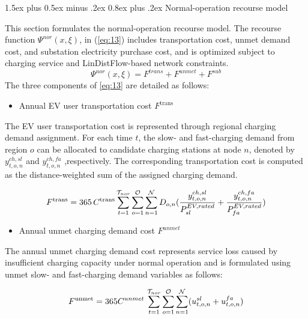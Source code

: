 \documentclass[journal]{IEEEtran}
\makeatletter
\renewcommand\subsubsection{\@startsection{subsubsection}{3}{\z@}%
  {1.5ex plus 0.5ex minus .2ex}%
  {0.8ex plus .2ex}%
  {\normalfont\normalsize\bfseries}}
\providecommand{\1}{\mathbf{1}}
\makeatother
\begin{document}
\subsubsection{Normal-operation recourse model}

This section formulates the normal-operation recourse model. The recourse function $\Psi^{{nor}}(x,\xi)$, in (\ref{eq:13})  includes transportation cost, unmet demand cost, and substation electricity purchase cost, and is optimized subject to charging service and LinDistFlow-based network constraints.
\begin{equation}
\Psi^{{nor}}(x,\xi)=F^{{trans}}+F^{{unmet}}+F^{{sub}}
\label{eq:13}
\end{equation}
\hspace*{0.5em} The three components of \eqref{eq:13} are detailed as follows:
\begin{itemize}
    \item Annual EV user transportation cost $F^{\text{trans}}$
\end{itemize}
\hspace*{0.5em} The EV user transportation cost is represented through regional charging demand assignment. For each time 
$t$, the slow- and fast-charging demand from region 
$o$ can be allocated to candidate charging stations at node 
$n$, denoted by $y^{{ch,sl}}_{t,o,n}$ and $y^{{ch,fa}}_{t,o,n}$ ,respectively. The corresponding transportation cost is computed as the distance-weighted sum of the assigned charging demand.

\begin{equation}
F^{\text{trans}}
=
365 \,C^{\text{trans}} 
\sum_{t=1}^{\mathcal{T}_{nor}}
\sum_{o=1}^{\mathcal{O}}
\sum_{n=1}^{\mathcal{N}} D_{o,n}
(\frac{y_{t,o,n}^{ch,sl}}{P_{sl}^{EV,rated}}+\frac{y_{t,o,n}^{ch,fa}}{P_{fa}^{EV,rated}}) \\
\end{equation}
\begin{itemize}
    \item Annual unmet charging demand cost $F^{unmet}$
\end{itemize}
 \hspace*{0.7em}The annual unmet charging demand cost represents service loss caused by insufficient charging capacity under normal operation and is formulated using unmet slow- and fast-charging demand variables as follows: 

\begin{equation}
F^{\text{unmet}}
=
365C^{{unmet}} \, 
\sum_{t=1}^{\mathcal{T}_{nor}}\sum_{o=1}^{\mathcal{O}}
\sum_{n=1}^{\mathcal{N}} (u_{t,o,n}^{sl}+u_{t,o,n}^{fa})
 \\
\end{equation}
\end{document}
